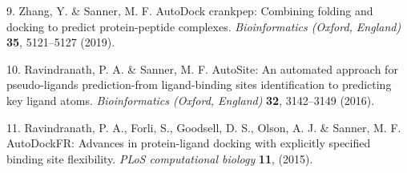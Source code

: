 \documentclass[
]{article}
\newenvironment{cslreferences}%
  {}%
  {\par}
\begin{document}
\begin{cslreferences}
\leavevmode\hypertarget{ref-AutodockCrankpZhang2019}{}%
9. Zhang, Y. \& Sanner, M. F. AutoDock crankpep: Combining folding and docking to predict protein-peptide complexes. \emph{Bioinformatics (Oxford, England)} \textbf{35}, 5121--5127 (2019).

\leavevmode\hypertarget{ref-AutositeAnAuRavind2016}{}%
10. Ravindranath, P. A. \& Sanner, M. F. AutoSite: An automated approach for pseudo-ligands prediction-from ligand-binding sites identification to predicting key ligand atoms. \emph{Bioinformatics (Oxford, England)} \textbf{32}, 3142--3149 (2016).

\leavevmode\hypertarget{ref-AutodockfrAdvRavind2015}{}%
11. Ravindranath, P. A., Forli, S., Goodsell, D. S., Olson, A. J. \& Sanner, M. F. AutoDockFR: Advances in protein-ligand docking with explicitly specified binding site flexibility. \emph{PLoS computational biology} \textbf{11}, (2015).
\end{cslreferences}
\end{document}
